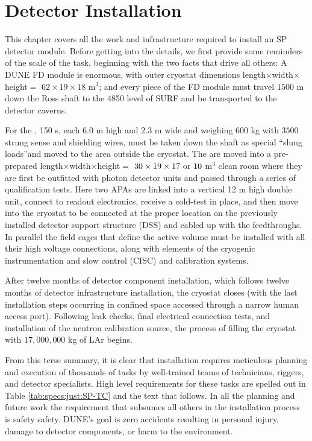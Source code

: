 \chapter{Detector Installation}
\label{ch:sp-tc}

This chapter covers all the work and infrastructure required to install an SP detector module. 
Before getting into the details, we first provide some reminders of the scale of the task, beginning with the two facts that drive all others: A DUNE FD module is enormous, with outer cryostat dimensions length$\times $width$\times $height$=$ $62\times 19\times 18$ m$^{3}$; and every piece of the FD module must travel $1500$ \si{m} down the Ross shaft to the 4850 level of SURF and be transported to the detector caverns.

For the , 150 s, each $6.0$ m high and $2.3$ m wide and  weighing $600$ kg with $3500$ strung sense and shielding wires, must be taken down the shaft as special \textquotedblleft slung loads\textquotedblright and moved to the area outside the  cryostat. 
The  are moved into a pre-prepared length$\times $width$\times $height$=$ $30\times 19 \times 17\ {\rm or}\ 10$ m$^{3}$ clean room where they are first be outfitted  with photon detector units and passed through a series of qualification tests.
Here two APAs are linked into a vertical 12 m high double unit, connect to readout electronics, receive a cold-test in place, and then move into the cryostat to be connected at the proper location on the previously installed detector support structure (DSS) and cabled up with the feedthroughs. 
In parallel the field cages that define the  active volume must be installed with all their high voltage connections, along with  elements of the cryogenic instrumentation and slow control (CISC) and calibration systems.

After twelve months of detector component installation, which follows twelve months of detector infrastructure installation, the cryostat closes (with the last installation steps occurring in confined space accessed through a narrow human access port). 
Following leak checks, final electrical connection tests, and installation of the neutron calibration source, the process of filling the cryostat with $17,000,000$ kg of LAr begins.

From this terse summary, it is clear that installation requires meticulous planning and execution of thousands of tasks by well-trained teams of technicians, riggers, and detector specialists. 
High level requirements for these tasks are spelled out in Table \ref{tab:specs:just:SP-TC} and the text that follows. 
In all the planning and future work the requirement that subsumes all others in the installation process is safety safety. DUNE's goal is zero accidents resulting in personal injury, damage to detector components, or harm to the environment.

